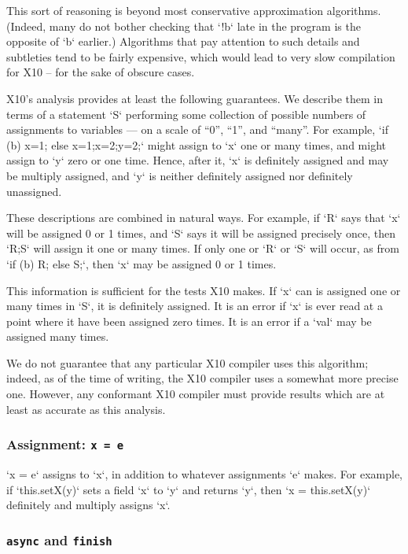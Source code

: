 This sort of reasoning is beyond  most conservative approximation algorithms.
(Indeed, many do not bother checking that \xcd`!b` late in the program is the
opposite of \xcd`b` earlier.)
Algorithms that pay attention to such details and subtleties tend to be
fairly expensive, which would lead to very slow compilation for X10 -- for the
sake of obscure cases.

X10's analysis provides at least the following guarantees. We describe them in
terms of a statement \xcd`S` performing some collection of possible numbers of
assignments to variables --- on a scale of ``0'', ``1'', and ``many''. For
example, \xcd`if (b) x=1; else {x=1;x=2;y=2;}` might assign to \xcd`x` one or
many times, and might assign to \xcd`y` zero or one time. Hence, after it,
\xcd`x` is definitely assigned and may be multiply assigned, and \xcd`y` is
neither definitely assigned nor definitely unassigned.  

These descriptions are combined in natural ways.  For example, if \xcd`R` says
that \xcd`x` will be assigned 0 or 1 times, and \xcd`S` says it will be
assigned precisely once, then \xcd`R;S` will assign it one or many times.  If
only one or \xcd`R` or \xcd`S` will occur, as from \xcd`if (b) R; else S;`, 
then \xcd`x` may be assigned 0 or 1 times. 

This information is sufficient for the tests X10 makes.  If \xcd`x` can is
assigned one or many times in \xcd`S`, it is definitely assigned.  It is an
error if 
\xcd`x` is ever read at a point where it have been assigned zero times.  It is
an error if a \xcd`val` may be assigned many times.

We do not guarantee that any particular X10 compiler uses this algorithm;
indeed, as of the time of writing, the X10 compiler uses a somewhat more
precise one.  However, any conformant X10 compiler must provide results which
are at least as accurate as this analysis.

\subsubsection{Assignment: {\tt x = e}}   

\xcd`x = e` assigns to \xcd`x`, in addition to whatever assignments
\xcd`e` makes.   For example, if \xcd`this.setX(y)` sets a field \xcd`x` to
\xcd`y` and returns \xcd`y`, then \xcd`x = this.setX(y)` definitely and
multiply assigns \xcd`x`.  

\subsubsection{{\tt async} and {\tt finish}}

